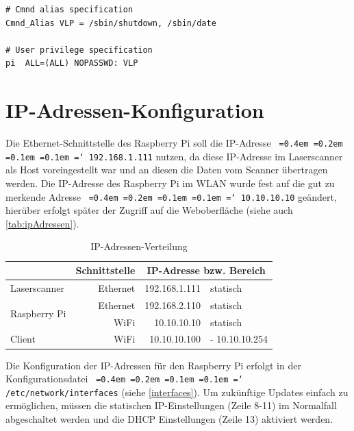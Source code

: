 \documentclass[a4paper,12pt,bibliography=totoc, listof=totoc,titlepage,pointlessnumbers]{scrreprt}
\newcommand*\justify{%
  \fontdimen2\font=0.4em%
  \fontdimen3\font=0.2em%
  \fontdimen4\font=0.1em%
  \fontdimen7\font=0.1em%
  \hyphenchar\font=`\-%
}
\newcommand{\code}[1]{\texttt{\justify{#1}}}
\begin{document}
\begin{lstlisting}[caption={Ergänzung der \code{/etc/sudoers}}, label={Lsudoers}]
# Cmnd alias specification
Cmnd_Alias VLP = /sbin/shutdown, /sbin/date

# User privilege specification
pi	ALL=(ALL) NOPASSWD: VLP
\end{lstlisting}

\section{IP-Adressen-Konfiguration}
Die Ethernet-Schnittstelle des Rasp\-berry Pi soll die IP-Adresse \code{192.168.1.111} nutzen, da diese IP-Adresse im Laser\-scan\-ner als Host voreingestellt war und an diesen die Daten vom Scanner übertragen werden. Die IP-Adresse des Rasp\-berry Pi im WLAN wurde fest auf die gut zu merkende Adresse \code{10.10.10.10} geändert, hierüber erfolgt später der Zugriff auf die Weboberfläche (siehe auch \autoref{tab:ipAdressen}).

\begin{table}
\centering
\begin{tabular}{l|r|r|l|}
\cline{2-4}
                                                    & Schnittstelle & \multicolumn{2}{c|}{IP-Adresse bzw. Bereich} \\ \hline
\multicolumn{1}{|l|}{Laser\-scan\-ner}                  & Ethernet      & 192.168.1.111        & statisch              \\ \hline
\multicolumn{1}{|l|}{\multirow{2}{*}{Rasp\-berry Pi}} & Ethernet      & 192.168.2.110        & statisch              \\ \cline{2-4} 
\multicolumn{1}{|l|}{}                              & WiFi          & 10.10.10.10          & statisch              \\ \hline
\multicolumn{1}{|l|}{Client}                        & WiFi          & 10.10.10.100         & - 10.10.10.254        \\ \hline
\end{tabular}
\caption{IP-Adressen-Verteilung}
\label{tab:ipAdressen}
\end{table}

Die Konfiguration der IP-Adressen für den Rasp\-berry Pi erfolgt in der Konfigurationsdatei \code{/etc/network/interfaces} (siehe \autoref{interfaces}). Um zukünftige Updates einfach zu ermöglichen, müssen die statischen IP-Einstellungen (Zeile 8-11) im Normalfall abgeschaltet werden und die DHCP Einstellungen (Zeile 13) aktiviert werden. \citep{accesspoint}
\end{document}

